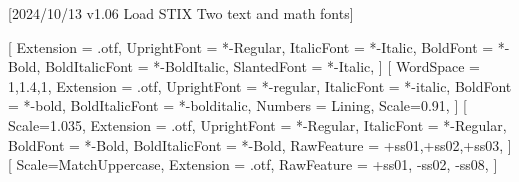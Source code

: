 
[2024/10/13 v1.06 Load STIX Two text and math fonts]

%
%
\ifpdftex
	\RequirePackage[T1]{fontenc}	
	\RequirePackage{bm}
\else
    \RequirePackage[warnings-off={mathtools-colon,mathtools-overbracket}]{unicode-math}
    \setmainfont{STIXTwoText}[%
       	Extension = .otf,
    	UprightFont = *-Regular,
    	ItalicFont = *-Italic,
    	BoldFont = *-Bold,
    	BoldItalicFont = *-BoldItalic,
		SlantedFont = *-Italic,
	]
	\setsansfont{texgyreheros}[%
		WordSpace = {1,1.4,1},
		Extension = .otf,
    	UprightFont = *-regular,
    	ItalicFont = *-italic,
    	BoldFont = *-bold,
    	BoldItalicFont = *-bolditalic,
		Numbers = Lining,
    	Scale=0.91,%
	]        
	\setmonofont{Inconsolatazi4}[%
        Scale=1.035,%
        Extension = .otf,
        UprightFont = *-Regular,
        ItalicFont = *-Regular,%
        BoldFont = *-Bold, 
    	BoldItalicFont = *-Bold,%
        RawFeature = {+ss01,+ss02,+ss03},
    ]             
	[%
    	Scale=MatchUppercase,
    	Extension = .otf,
    	RawFeature = {+ss01, -ss02, -ss08},
   ]
   \newcommand*{\FRAC}[1]{{\addfontfeature{Fractions=On}#1}}%
\fi
